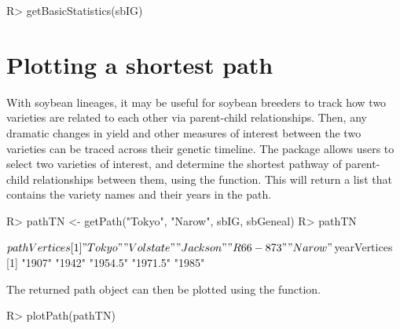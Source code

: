 \documentclass[article,shortnames]{jss}
\begin{document}
\begin{CodeChunk}
\begin{CodeInput}
R> getBasicStatistics(sbIG)
\end{CodeInput}
\end{CodeChunk}

\section{Plotting a shortest path}
\label{psp}

With soybean lineages, it may be useful for soybean breeders to track how two varieties are related to each other via parent-child relationships. Then, any dramatic changes in yield and other measures of interest between the two varieties can be traced across their genetic timeline. The  package allows users to select two varieties of interest, and determine the shortest pathway of parent-child relationships between them, using the  function. This will return a list that contains the variety names and their years in the path.

\begin{CodeChunk}
\begin{CodeInput}
R> pathTN <- getPath("Tokyo", "Narow", sbIG, sbGeneal)
R> pathTN
\end{CodeInput}
\begin{CodeOutput}
$pathVertices
[1] "Tokyo"    "Volstate" "Jackson"  "R66-873"  "Narow"   
$yearVertices
[1] "1907"   "1942"   "1954.5" "1971.5" "1985" 
\end{CodeOutput}
\end{CodeChunk}

The returned path object can then be plotted using the  function.

\begin{Code}
R> plotPath(pathTN)
\end{Code}
\end{document}
